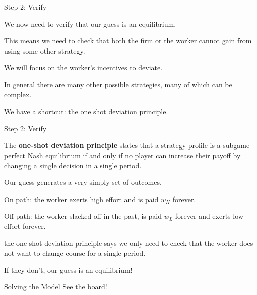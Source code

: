 \documentclass[aspectratio=169,usenames,dvipsnames]{beamer}
\newenvironment{wideitemize}{\itemize\addtolength{\itemsep}{10pt}}{\enditemize}
\begin{document}
\begin{frame}{Step 2: Verify}
\begin{wideitemize}
    \item We now need to verify that our guess is an equilibrium.
    \item This means we need to check that both the firm or the worker cannot gain from using some other strategy.
    \item We will focus on the worker's incentives to deviate.
    \item In general there are many other possible strategies, many of which can be complex.
    \item We have a shortcut: the one shot deviation principle.
\end{wideitemize}
    
\end{frame}
\begin{frame}{Step 2: Verify}
\begin{definition}
    The \textbf{one-shot deviation principle} states that a strategy profile is a subgame-perfect Nash equilibrium if and only if no player can increase their payoff by changing a single decision in a single period. 
    \end{definition}

    \begin{wideitemize}
        \item Our guess generates a very simply set of outcomes.
        \item On path: the worker exerts high effort and is paid $w_H$ forever.
        \item Off path: the worker slacked off in the past, is paid $w_L$ forever and exerts low effort forever.
        \item the one-shot-deviation principle says we only need to check that the worker does not want to change course for a single period.
        \item If they don't, our guess is an equilibrium!
    \end{wideitemize}
    
\end{frame}

\begin{frame}{Solving the Model}
\centering
    \huge See the board!

\end{frame}
\end{document}
